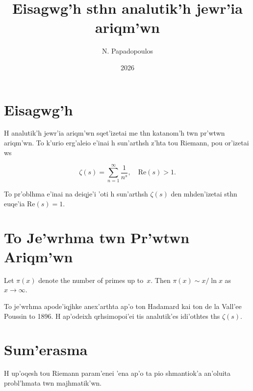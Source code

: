 \documentclass{article}
\title{\selectlanguage{greek}Eisagwg'h sthn analutik'h jewr'ia ariqm'wn}
\author{\selectlanguage{greek}N. Papadopoulos}
\date{2026}
\begin{document}
\maketitle


\section{Eisagwg'h}

H analutik'h jewr'ia ariqm'wn sqet'izetai me thn katanom'h twn
pr'wtwn ariqm'wn.  To k'urio erg'aleio e'inai h sun'arthsh z'hta
tou Riemann, pou or'izetai ws

\[
  \zeta(s) = \sum_{n=1}^{\infty} \frac{1}{n^s}, \quad \text{Re}(s) > 1.
\]

To pr'oblhma e'inai na deiqje'i 'oti h sun'arthsh $\zeta(s)$
den mhden'izetai sthn euqe'ia $\text{Re}(s) = 1$.

\section{To Je'wrhma twn Pr'wtwn Ariqm'wn}

\begin{theorem}
Let $\pi(x)$ denote the number of primes up to~$x$.  Then
$\pi(x) \sim x / \ln x$ as $x \to \infty$.
\end{theorem}

To je'wrhma apode'iqjhke anex'arthta ap'o ton Hadamard kai ton
de la Vall'ee Poussin to 1896.  H ap'odeixh qrhsimopoi'ei tis
analutik'es idi'othtes ths $\zeta(s)$.

\section{Sum'erasma}

H up'oqesh tou Riemann param'enei 'ena ap'o ta pio shmantiok'a
an'oluita probl'hmata twn majhmatik'wn.
\end{document}

